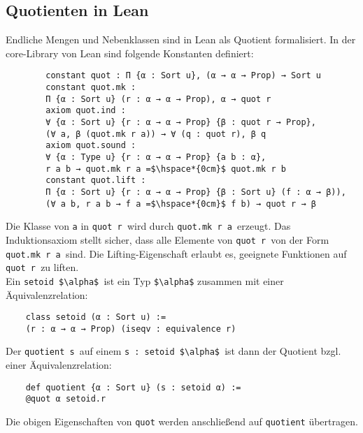 \documentclass[a4paper,12pt]{scrartcl}
\begin{document}
	\subsection{Quotienten in Lean}
	Endliche Mengen und Nebenklassen sind in Lean als Quotient formalisiert.
	In der core-Library von Lean sind folgende Konstanten definiert:
	\begin{lstlisting}
		constant quot : Π {α : Sort u}, (α → α → Prop) → Sort u
		constant quot.mk :
		Π {α : Sort u} (r : α → α → Prop), α → quot r
		axiom quot.ind :
		∀ {α : Sort u} {r : α → α → Prop} {β : quot r → Prop},
		(∀ a, β (quot.mk r a)) → ∀ (q : quot r), β q
		axiom quot.sound :
		∀ {α : Type u} {r : α → α → Prop} {a b : α},
		r a b → quot.mk r a =$\hspace*{0cm}$ quot.mk r b
		constant quot.lift :
		Π {α : Sort u} {r : α → α → Prop} {β : Sort u} (f : α → β)),
		(∀ a b, r a b → f a =$\hspace*{0cm}$ f b) → quot r → β
	\end{lstlisting}
	Die Klasse von \lstinline{a} in \lstinline{quot r }wird durch \lstinline{quot.mk r a }erzeugt.
	Das Induktionsaxiom stellt sicher, dass alle Elemente von \lstinline{quot r }von der Form \lstinline{quot.mk r a }sind.
	Die Lifting-Eigenschaft erlaubt es, geeignete Funktionen auf \lstinline{quot r }zu liften.\\
	Ein \lstinline{setoid $\alpha$ }ist ein Typ \lstinline{$\alpha$} zusammen mit einer Äquivalenzrelation:
	\begin{lstlisting}
	class setoid (α : Sort u) :=
	(r : α → α → Prop) (iseqv : equivalence r)
	\end{lstlisting} 
	Der \lstinline{quotient s }auf einem \lstinline{s : setoid $\alpha$ }ist dann der Quotient bzgl. einer Äquivalenzrelation:
	\begin{lstlisting}
	def quotient {α : Sort u} (s : setoid α) :=
	@quot α setoid.r
	\end{lstlisting}
	Die obigen Eigenschaften von \lstinline{quot} werden anschließend auf \lstinline|quotient| übertragen.
	
\end{document}
